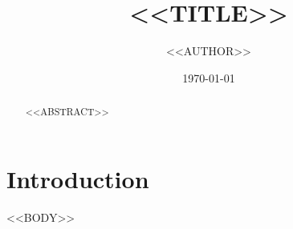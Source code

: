 \documentclass[11pt]{article}
\title{<<TITLE>>}
\author{<<AUTHOR>>}
\date{\today}
\begin{document}
\maketitle
\begin{abstract}
<<ABSTRACT>>
\end{abstract}
\section{Introduction}
<<BODY>>


\end{document}
